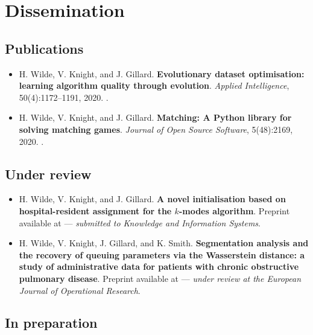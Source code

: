 \chapter*{Dissemination}\label{dissemination}

\section*{Publications}

\begin{itemize}
    \item \cite{Wilde2020:edo} H. Wilde, V. Knight, and J. Gillard.
        \textbf{Evolutionary dataset optimisation: learning algorithm quality
        through evolution}.  \emph{Applied Intelligence}, 50(4):1172–1191,
        2020. .
    \item \cite{Wilde2020:matching} H. Wilde, V. Knight, and J. Gillard.
        \textbf{Matching: A Python library for solving matching games}.
        \emph{Journal of Open Source Software}, 5(48):2169,
        2020. .
\end{itemize}

\section*{Under review}

\begin{itemize}
    \item \cite{Wilde2020:kmodes} H. Wilde, V. Knight, and J. Gillard. \textbf{A
        novel initialisation based on hospital-resident assignment for the
        \(k\)-modes algorithm}. Preprint available at  ---
        \emph{submitted to Knowledge and Information Systems}.
    \item \cite{Wilde2020:copd} H. Wilde, V. Knight, J. Gillard, and K. Smith.
        \textbf{Segmentation analysis and the recovery of queuing parameters via
        the Wasserstein distance: a study of administrative data for patients
        with chronic obstructive pulmonary disease}. Preprint available at
         ---
        \emph{under review at the European Journal of Operational Research}.
\end{itemize}

\section*{In preparation}

